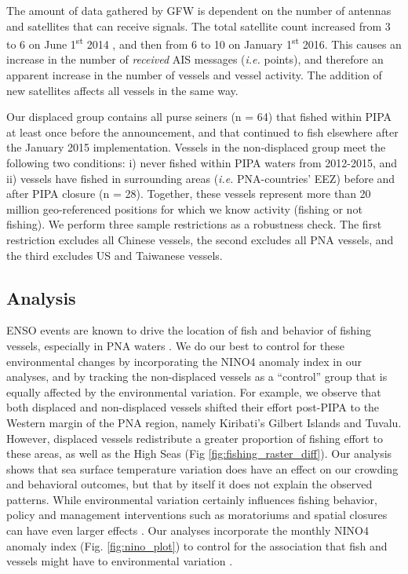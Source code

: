 \documentclass[12pt]{article}
\begin{document}
The amount of data gathered by GFW is dependent on the number of antennas and satellites that can receive signals. The total satellite count increased from 3 to 6 on June 1\textsuperscript{st} 2014 , and then from 6 to 10 on January 1\textsuperscript{st} 2016. This causes an increase in the number of \emph{received} AIS messages (\emph{i.e.} points), and therefore an apparent increase in the number of vessels and vessel activity. The addition of new satellites affects all vessels in the same way.

Our displaced group contains all purse seiners (n = 64) that fished within PIPA at least once before the announcement, and that continued to fish elsewhere after the January 2015 implementation. Vessels in the non-displaced group meet the following two conditions: i) never fished within PIPA waters from 2012-2015, and ii) vessels have fished in surrounding areas (\emph{i.e.} PNA-countries' EEZ) before and after PIPA closure (n = 28). Together, these vessels represent more than 20 million geo-referenced positions for which we know activity (fishing or not fishing). We perform three sample restrictions as a robustness check. The first restriction excludes all Chinese vessels, the second excludes all PNA vessels, and the third excludes US and Taiwanese vessels.

\subsection{Analysis}

ENSO events are known to drive the location of fish and behavior of fishing vessels, especially in PNA waters \cite{lehodey_1997,kroodsma_2018,aqorau_2018}. We do our best to control for these environmental changes by incorporating the NINO4 anomaly index in our analyses, and by tracking the non-displaced vessels as a ``control'' group that is equally affected by the environmental variation. For example, we observe that both displaced and non-displaced vessels shifted their effort post-PIPA to the Western margin of the PNA region, namely Kiribati's Gilbert Islands and Tuvalu. However, displaced vessels redistribute a greater proportion of fishing effort to these areas, as well as the High Seas (Fig \ref{fig:fishing_raster_diff}). Our analysis shows that sea surface temperature variation does have an effect on our crowding and behavioral outcomes, but that by itself it does not explain the observed patterns. While environmental variation certainly influences fishing behavior, policy and management interventions such as moratoriums and spatial closures can have even larger effects \cite{kroodsma_2018}.  Our analyses incorporate the monthly NINO4 anomaly index (Fig. \ref{fig:nino_plot}) to control for the association that fish and vessels might have to environmental variation \cite{lehodey_1997,kroodsma_2018,aqorau_2018}.
\end{document}
